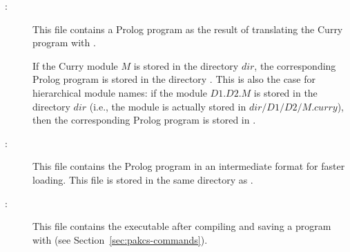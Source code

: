 \begin{description}
\item[:] This file contains a Prolog program
as the result of translating the Curry program with \CYS.

If the Curry module $M$ is stored in the directory $dir$,
the corresponding Prolog program is stored in the directory
.
This is also the case for hierarchical module names:
if the module $D1.D2.M$ is stored in the directory $dir$
(i.e., the module is actually stored in $dir/D1/D2/M.curry$),
then the corresponding Prolog program is stored in
.

\item[:] This file contains the Prolog program
 in an intermediate format for faster loading.
This file is stored in the same directory as .

\item[:] This file contains the executable
after compiling and saving a program with \CYS
(see Section~\ref{sec:pakcs-commands}).

\end{description}


